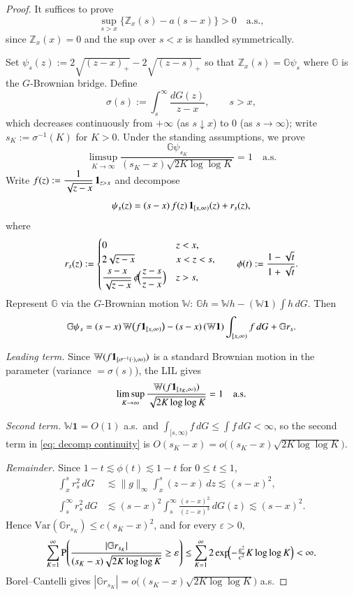 \begin{proof}
It suffices to prove
\begin{equation}\label{eq: sup positive continuity}
  \sup_{s>x}\bigl\{\mathbb{Z}_x(s)-a(s-x)\bigr\}>0\quad\text{a.s.},
\end{equation}
since $\mathbb{Z}_x(x)=0$ and the sup over $s<x$ is handled symmetrically.

Set $\psi_s(z):=2\sqrt{(z-x)_+}-2\sqrt{(z-s)_+}$ so that $\mathbb{Z}_x(s)=\mathbb{G}\psi_s$
where $\mathbb{G}$ is the $G$-Brownian bridge.  Define
\[
  \sigma(s):=\int_s^\infty\frac{dG(z)}{z-x},\qquad s>x,
\]
which decreases continuously from $+\infty$ (as $s\downarrow x$) to $0$ (as
$s\to\infty$); write $s_K:=\sigma^{-1}(K)$ for $K>0$. Under the standing assumptions, we prove
\[
  \limsup_{K\to\infty}\frac{\mathbb{G}\psi_{s_K}}{(s_K-x)\sqrt{2K\log\log K}}=1
  \quad\text{a.s.}
\]
Write $f(z):=\dfrac{1}{\sqrt{z-x}}\,\mathbf{1}_{z>x}$ and decompose
\[
  \psi_s(z)=(s-x)\,f(z)\,\mathbf{1}_{[s,\infty)}(z)+r_s(z),
\]
where
\[
  r_s(z):=
  \begin{cases}
    0 & z<x,\\
    2\sqrt{z-x} & x<z<s,\\[2pt]
    \dfrac{s-x}{\sqrt{z-x}}\,\phi\!\Bigl(\dfrac{z-s}{z-x}\Bigr) & z>s,
  \end{cases}
  \qquad \phi(t):=\frac{1-\sqrt{t}}{1+\sqrt{t}}.
\]
Represent $\mathbb{G}$ via the $G$-Brownian motion $\mathbb{W}$: $\mathbb{G} h=\mathbb{W} h-(\mathbb{W} \mathbf{1})\int h\,dG$.
Then
\begin{equation}\label{eq: decomp continuity}
  \mathbb{G}\psi_s
  =(s-x)\,\mathbb{W}\bigl(f\mathbf{1}_{[s,\infty)}\bigr)
  -(s-x)\,(\mathbb{W} \mathbf{1})\int_{[s,\infty)}f\,dG
  +\mathbb{G} r_s.
\end{equation}

\textit{Leading term.}  Since $\mathbb{W}(f\mathbf{1}_{[\sigma^{-1}(\cdot),\infty)})$
is a standard Brownian motion in the parameter (variance $=\sigma(s)$),
the LIL gives
\[
  \limsup_{K\to\infty}\frac{\mathbb{W}(f\mathbf{1}_{[s_K,\infty)})}{\sqrt{2K\log\log K}}=1
  \quad\text{a.s.}
\]

\textit{Second term.} $\mathbb{W}\mathbf{1}=O(1)$ a.s.\ and
$\int_{[s,\infty)}f\,dG\le\int f\,dG<\infty$, so the second term in
\eqref{eq: decomp continuity} is $O(s_K-x)=o\bigl((s_K-x)\sqrt{2K\log\log K}\bigr)$.

\textit{Remainder.}  Since $1-t\lesssim\phi(t)\lesssim 1-t$ for $0\le t\le1$,
\begin{align*}
  \int_x^s r_s^2\,dG&\lesssim\|g\|_\infty\int_x^s(z-x)\,dz\lesssim(s-x)^2,\\
  \int_s^\infty r_s^2\,dG
  &\lesssim(s-x)^2\int_s^\infty\frac{(s-x)^2}{(z-x)^3}\,dG(z)\lesssim(s-x)^2.
\end{align*}
Hence $\mathrm{Var}(\mathbb{G} r_{s_K})\le c(s_K-x)^2$, and for every $\varepsilon>0$,
\[
  \sum_{K=1}^\infty\mathrm{P}\!\left(
    \frac{|\mathbb{G} r_{s_K}|}{(s_K-x)\sqrt{2K\log\log K}}\ge\varepsilon
  \right)
  \le\sum_{K=1}^\infty 2\exp\!\Bigl(-\tfrac{\varepsilon^2}{c^2}K\log\log K\Bigr)
  <\infty.
\]
Borel--Cantelli gives
$|\mathbb{G} r_{s_K}|=o\bigl((s_K-x)\sqrt{2K\log\log K}\bigr)$ a.s.


\end{proof}
